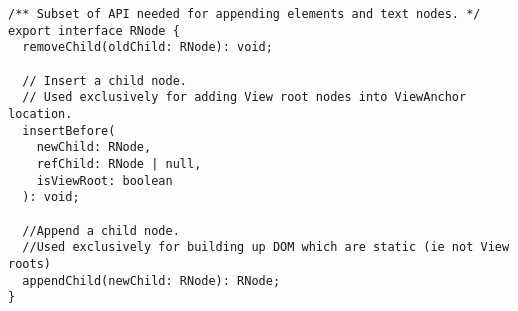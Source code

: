 \begin{verbatim}
/** Subset of API needed for appending elements and text nodes. */
export interface RNode {
  removeChild(oldChild: RNode): void;

  // Insert a child node.
  // Used exclusively for adding View root nodes into ViewAnchor location.
  insertBefore(
    newChild: RNode,
    refChild: RNode | null,
    isViewRoot: boolean
  ): void;

  //Append a child node.
  //Used exclusively for building up DOM which are static (ie not View roots)
  appendChild(newChild: RNode): RNode;
}
\end{verbatim}
